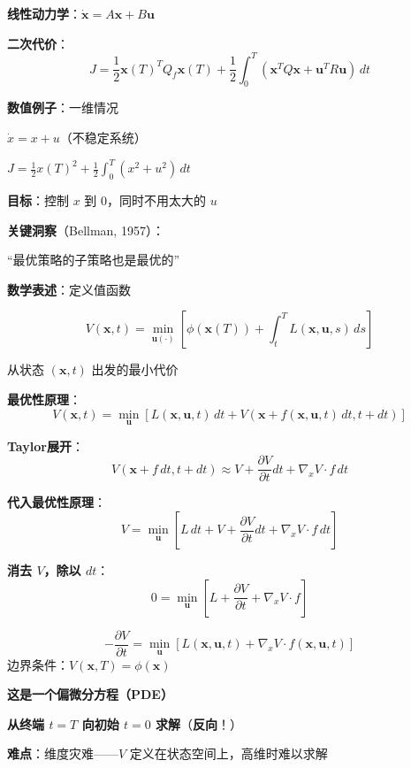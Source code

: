 \documentclass[12pt, a4paper]{ctexart}
\begin{document}
\begin{blackboard}

\textbf{线性动力学}：$\dot{\mathbf{x}} = A\mathbf{x} + B\mathbf{u}$

\textbf{二次代价}：
\[
J = \frac{1}{2}\mathbf{x}(T)^T Q_f \mathbf{x}(T) + \frac{1}{2}\int_0^T (\mathbf{x}^T Q \mathbf{x} + \mathbf{u}^T R \mathbf{u}) \, dt
\]

\textbf{数值例子}：一维情况

$\dot{x} = x + u$（不稳定系统）

$J = \frac{1}{2}x(T)^2 + \frac{1}{2}\int_0^T (x^2 + u^2) \, dt$

\textbf{目标}：控制 $x$ 到 0，同时不用太大的 $u$

\end{blackboard}

\begin{blackboard}[Bellman的最优性原理]

\textbf{关键洞察}（Bellman, 1957）：

``最优策略的子策略也是最优的''

\textbf{数学表述}：定义值函数

\[
V(\mathbf{x}, t) = \min_{\mathbf{u}(\cdot)} \left[ \phi(\mathbf{x}(T)) + \int_t^T L(\mathbf{x}, \mathbf{u}, s) \, ds \right]
\]

从状态 $(\mathbf{x}, t)$ 出发的最小代价

\textbf{最优性原理}：
\[
V(\mathbf{x}, t) = \min_{\mathbf{u}} \left[ L(\mathbf{x}, \mathbf{u}, t) \, dt + V(\mathbf{x} + f(\mathbf{x}, \mathbf{u}, t) \, dt, t + dt) \right]
\]

\end{blackboard}

\begin{blackboard}[HJB方程的推导]

\textbf{Taylor展开}：
\[
V(\mathbf{x} + f \, dt, t + dt) \approx V + \frac{\partial V}{\partial t} dt + \nabla_x V \cdot f \, dt
\]

\textbf{代入最优性原理}：
\[
V = \min_{\mathbf{u}} \left[ L \, dt + V + \frac{\partial V}{\partial t} dt + \nabla_x V \cdot f \, dt \right]
\]

\textbf{消去 $V$，除以 $dt$}：
\[
0 = \min_{\mathbf{u}} \left[ L + \frac{\partial V}{\partial t} + \nabla_x V \cdot f \right]
\]

\end{blackboard}

\begin{blackboard}

\begin{keypoint}[HJB方程]
\[
\boxed{-\frac{\partial V}{\partial t} = \min_{\mathbf{u}} \left[ L(\mathbf{x}, \mathbf{u}, t) + \nabla_x V \cdot f(\mathbf{x}, \mathbf{u}, t) \right]}
\]
边界条件：$V(\mathbf{x}, T) = \phi(\mathbf{x})$
\end{keypoint}

\textbf{这是一个偏微分方程（PDE）}

\textbf{从终端 $t = T$ 向初始 $t = 0$ 求解}（\textbf{反向}！）

\textbf{难点}：维度灾难——$V$ 定义在状态空间上，高维时难以求解

\end{blackboard}
\end{document}
